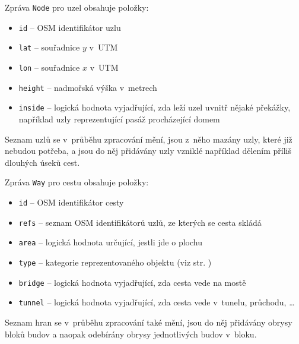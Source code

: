 Zpráva \verb|Node| pro uzel obsahuje položky:
\begin{itemize}
	\item \verb|id| -- OSM identifikátor uzlu
	\item \verb|lat| -- souřadnice $y$ v~UTM
	\item \verb|lon| -- souřadnice $x$ v~UTM
	\item \verb|height| -- nadmořská výška v~metrech
	\item \verb|inside| -- logická hodnota vyjadřující, zda leží uzel uvnitř
	nějaké překážky, například uzly reprezentující pasáž procházející domem
\end{itemize}
Seznam uzlů se v~průběhu zpracování mění, jsou z~něho mazány uzly, které již
nebudou potřeba, a jsou do něj přidávány uzly vzniklé například dělením příliš
dlouhých úseků cest.

Zpráva \verb|Way| pro cestu obsahuje položky:
\begin{itemize}
	\item \verb|id| -- OSM identifikátor cesty
	\item \verb|refs| -- seznam OSM identifikátorů uzlů, ze kterých se cesta
	skládá
	\item \verb|area| -- logická hodnota určující, jestli jde o plochu
	\item \verb|type| -- kategorie reprezentovaného objektu (viz str. 
	\pageref{label:kategorie})
	\item \verb|bridge| -- logická hodnota vyjadřující, zda cesta vede na mostě
	\item \verb|tunnel| -- logická hodnota vyjadřující, zda cesta vede
v~tunelu, průchodu, \dots
\end{itemize}
Seznam hran se v~průběhu zpracování také mění, jsou do něj přidávány obrysy
bloků budov a naopak odebírány obrysy jednotlivých budov v~bloku.

